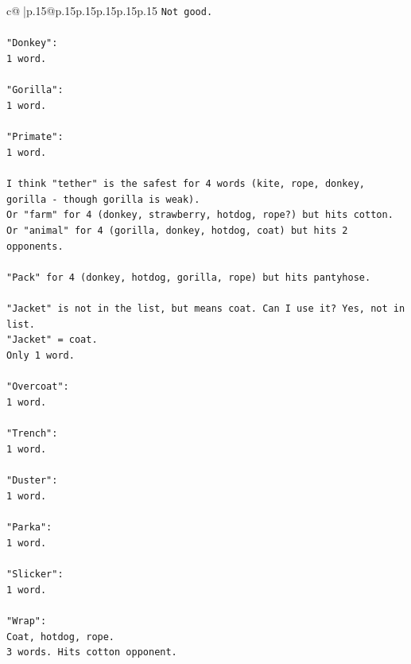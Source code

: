 \documentclass{article}
\begin{document}
{\begin{supertabular}{c@{$\;$}|p{.15\linewidth}@{}p{.15\linewidth}p{.15\linewidth}p{.15\linewidth}p{.15\linewidth}p{.15\linewidth}}
{{{\texttt{Not good.} \\
\\ 
\texttt{"Donkey":} \\
\texttt{1 word.} \\
\\ 
\texttt{"Gorilla":} \\
\texttt{1 word.} \\
\\ 
\texttt{"Primate":} \\
\texttt{1 word.} \\
\\ 
\texttt{I think "tether" is the safest for 4 words (kite, rope, donkey, gorilla {-} though gorilla is weak).} \\
\texttt{Or "farm" for 4 (donkey, strawberry, hotdog, rope?) but hits cotton.} \\
\texttt{Or "animal" for 4 (gorilla, donkey, hotdog, coat) but hits 2 opponents.} \\
\\ 
\texttt{"Pack" for 4 (donkey, hotdog, gorilla, rope) but hits pantyhose.} \\
\\ 
\texttt{"Jacket" is not in the list, but means coat. Can I use it? Yes, not in list.} \\
\texttt{"Jacket" = coat.} \\
\texttt{Only 1 word.} \\
\\ 
\texttt{"Overcoat":} \\
\texttt{1 word.} \\
\\ 
\texttt{"Trench":} \\
\texttt{1 word.} \\
\\ 
\texttt{"Duster":} \\
\texttt{1 word.} \\
\\ 
\texttt{"Parka":} \\
\texttt{1 word.} \\
\\ 
\texttt{"Slicker":} \\
\texttt{1 word.} \\
\\ 
\texttt{"Wrap":} \\
\texttt{Coat, hotdog, rope.} \\
\texttt{3 words. Hits cotton opponent.} \\
\\ 
}}}
\end{supertabular}}
\end{document}
